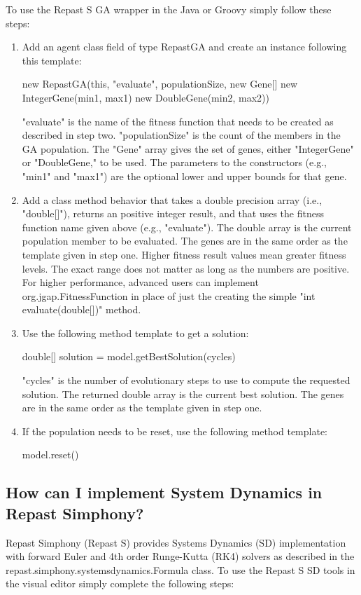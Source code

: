 \documentclass[11pt]{article}
\begin{document}
To use the Repast S GA wrapper in the Java or Groovy simply follow these steps:
\begin{enumerate}
\item Add an agent class field of type RepastGA and create an instance following this template:

new RepastGA(this, "evaluate", populationSize, new Gene[]{ new IntegerGene(min1, max1) new DoubleGene(min2, max2)})

"evaluate" is the name of the fitness function that needs to be created as described in step two. "populationSize" is the count of the members in the GA population. The "Gene" array gives the set of genes, either "IntegerGene" or "DoubleGene," to be used. The parameters to the constructors (e.g., "min1" and "max1") are the optional lower and upper bounds for that gene.
\item Add a class method behavior that takes a double precision array (i.e., "double[]"), returns an positive integer result, and that uses the fitness function name given above (e.g., "evaluate"). The double array is the current population member to be evaluated. The genes are in the same order as the template given in step one. Higher fitness result values mean greater fitness levels. The exact range does not matter as long as the numbers are positive. For higher performance, advanced users can implement org.jgap.FitnessFunction in place of just the creating the simple "int evaluate(double[])" method.

\item Use the following method template to get a solution:

double[] solution = model.getBestSolution(cycles)

"cycles" is the number of evolutionary steps to use to compute the requested solution. The returned double array is the current best solution. The genes are in the same order as the template given in step one.
 \item If the population needs to be reset, use the following method template:

model.reset() 
\end{enumerate}

\subsection{How can I implement System Dynamics in Repast Simphony?}
\label{prs:system_dynamics}

Repast Simphony (Repast S) provides Systems Dynamics (SD) implementation with forward Euler and 4th order Runge-Kutta (RK4) solvers as described in the  repast.simphony.systemsdynamics.Formula class. To use the Repast S SD tools in the visual editor simply complete the following steps:
\end{document}
